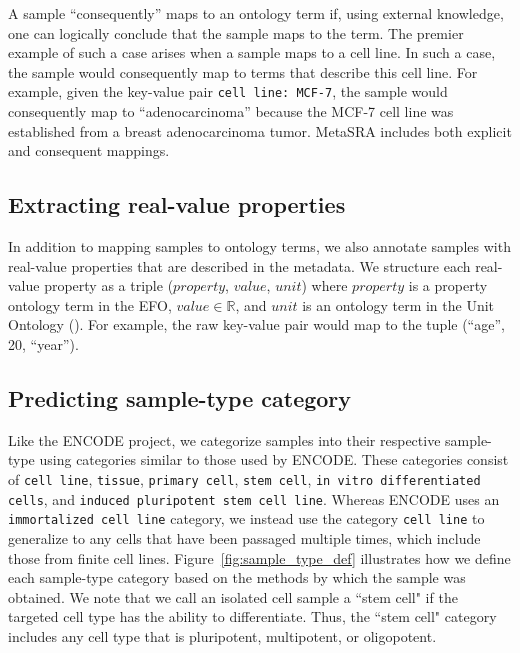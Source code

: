 A sample ``consequently'' maps to an ontology term if, using external knowledge, one can logically conclude that the sample maps to the term. The premier example of such a case arises when a sample maps to a cell line.  In such a case, the sample would consequently map to terms that describe this cell line. For example, given the key-value pair \texttt{cell line: MCF-7}, the sample would consequently map to ``adenocarcinoma'' because the MCF-7 cell line was established from a breast adenocarcinoma tumor.  MetaSRA includes both explicit and consequent mappings.

\subsection{Extracting real-value properties}
In addition to mapping samples to ontology terms, we also annotate samples with real-value properties that are described in the metadata.  We structure each real-value property as a triple ($property$, $value$, $unit$) where $property$ is a property ontology term in the EFO, $value \in \mathbb{R}$, and $unit$ is an ontology term in the Unit Ontology (\citealp{Gkoutos}).  For example, the raw key-value pair  would map to the tuple (``age'', 20, ``year'').

\subsection{Predicting sample-type category}

Like the ENCODE project, we categorize samples into their respective sample-type using categories similar to those used by ENCODE.  These categories consist of \texttt{cell line}, \texttt{tissue}, \texttt{primary cell}, \texttt{stem cell}, \texttt{in vitro differentiated cells}, and \texttt{induced pluripotent stem cell line}. Whereas ENCODE uses an \texttt{immortalized cell line} category, we instead use the category \texttt{cell line} to generalize to any cells that have been passaged multiple times, which include those from finite cell lines.  Figure~\ref{fig:sample_type_def} illustrates how we define each sample-type category based on the methods by which the sample was obtained. We note that we call an isolated cell sample a ``stem cell" if the targeted cell type has the ability to differentiate.  Thus, the ``stem cell" category includes any cell type that is pluripotent, multipotent, or oligopotent.   

